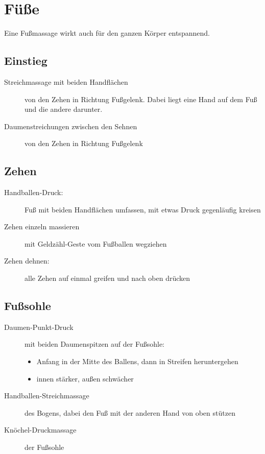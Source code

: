 \section{Füße}

Eine Fußmassage wirkt auch für den ganzen Körper entspannend.

\subsection{Einstieg}
\begin{description}
	\item[Streichmassage mit beiden Handflächen] von den Zehen in Richtung Fußgelenk. Dabei liegt eine Hand auf dem Fuß und die andere darunter.
	\item[Daumenstreichungen zwischen den Sehnen] von den Zehen in Richtung Fußgelenk
\end{description}

\subsection{Zehen}
\begin{description}
	\item[Handballen-Druck:] Fuß mit beiden Handflächen umfassen, mit etwas Druck gegenläufig kreisen
	\item[Zehen einzeln massieren] mit Geldzähl-Geste vom Fußballen wegziehen
	\item[Zehen dehnen:] alle Zehen auf einmal greifen und nach oben drücken
\end{description}

\subsection{Fußsohle}
\begin{description}
\item[Daumen-Punkt-Druck] mit beiden Daumenspitzen auf der Fußsohle:
	\begin{itemize}
		\item Anfang in der Mitte des Ballens, dann in Streifen heruntergehen
		\item innen stärker, außen schwächer
	\end{itemize}
\item[Handballen-Streichmassage] des Bogens, dabei den Fuß mit der anderen Hand von oben stützen
\item[Knöchel-Druckmassage] der Fußsohle
\end{description}

